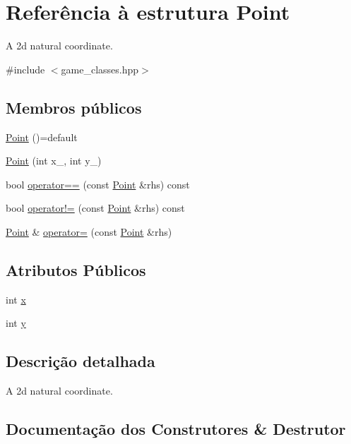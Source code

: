 \hypertarget{structPoint}{}\section{Referência à estrutura Point}
\label{structPoint}


A 2d natural coordinate.  




{\ttfamily \#include $<$game\+\_\+classes.\+hpp$>$}

\subsection*{Membros públicos}
\begin{DoxyCompactItemize}
\item 
\hyperlink{structPoint_a257415ad611a16bb73628efcdb87d0fd}{Point} ()=default
\item 
\hyperlink{structPoint_a7733108bf07d2ef72e1b55aed68eb2fc}{Point} (int x\+\_\+, int y\+\_\+)
\item 
bool \hyperlink{structPoint_a0c0525e4a539e462236840739cd81495}{operator==} (const \hyperlink{structPoint}{Point} \&rhs) const
\item 
bool \hyperlink{structPoint_a412beea7de93a9e22b8ace5fb4170111}{operator!=} (const \hyperlink{structPoint}{Point} \&rhs) const
\item 
\hyperlink{structPoint}{Point} \& \hyperlink{structPoint_a0367b61d5e647f2cfa5f1c4897be31ec}{operator=} (const \hyperlink{structPoint}{Point} \&rhs)
\end{DoxyCompactItemize}
\subsection*{Atributos Públicos}
\begin{DoxyCompactItemize}
\item 
int \hyperlink{structPoint_a8c779e11e694b20e0946105a9f5de842}{x}
\item 
int \hyperlink{structPoint_a2e1b5fb2b2a83571f5c0bc0f66a73cf7}{y}
\end{DoxyCompactItemize}


\subsection{Descrição detalhada}
A 2d natural coordinate. 

\subsection{Documentação dos Construtores \& Destrutor}
\mbox{\label{structPoint_a257415ad611a16bb73628efcdb87d0fd}} 
